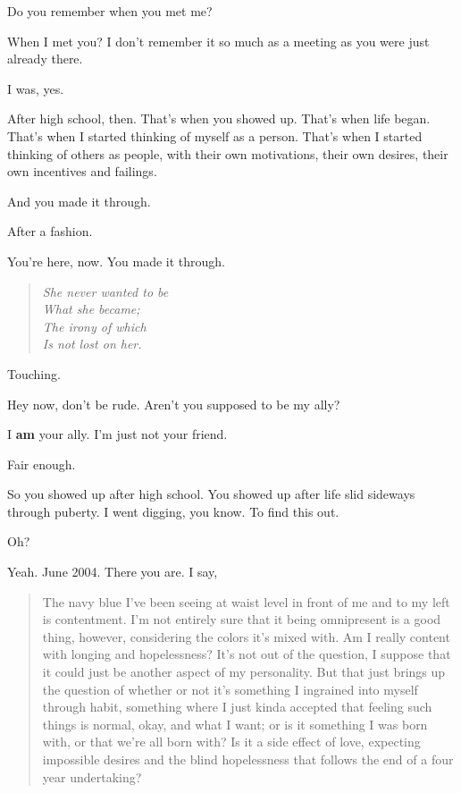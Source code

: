 \label{ally:3}
\begin{paracol}{2}
  \begin{leftcolumn}

\begin{ally}
Do you remember when you met me?
\end{ally}
When I met you? I don't remember it so much as a meeting as you were just already there.

\begin{ally}
I was, yes.
\end{ally}
After high school, then. That's when you showed up. That's when life began. That's when I started thinking of myself as a person. That's when I started thinking of others as people, with their own motivations, their own desires, their own incentives and failings.

\begin{ally}
And you made it through.
\end{ally}
After a fashion.

\begin{ally}
You're here, now. You made it through.
\end{ally}
\begin{verse}
\emph{She never wanted to be\\
\vin What she became;\\
\vin \vin The irony of which\\
\vin \vin \vin Is not lost on her.}
\end{verse}

\begin{ally}
Touching.
\end{ally}
Hey now, don't be rude. Aren't you supposed to be my ally?

\begin{ally}
I \textbf{am} your ally. I'm just not your friend.
\end{ally}
Fair enough.

So you showed up after high school. You showed up after life slid sideways through puberty. I went digging, you know. To find this out.

\begin{ally}
Oh?
\end{ally}
Yeah. June 2004. There you are. I say,

\begin{quotation}
The navy blue I've been seeing at waist level in front of me and to my left is contentment. I'm not entirely sure that it being omnipresent is a good thing, however, considering the colors it's mixed with. Am I really content with longing and hopelessness? It's not out of the question, I suppose that it could just be another aspect of my personality. But that just brings up the question of whether or not it's something I ingrained into myself through habit, something where I just kinda accepted that feeling such things is normal, okay, and what I want; or is it something I was born with, or that we're all born with? Is it a side effect of love, expecting impossible desires and the blind hopelessness that follows the end of a four year undertaking?
\end{quotation}


\end{leftcolumn}
\end{paracol}
